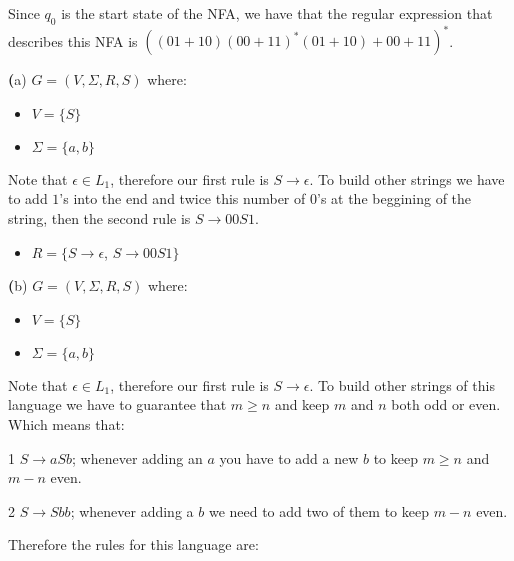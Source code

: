 \documentclass[11pt]{article}
\newcommand{\question}[2] {\vspace{0.3in}\noindent{\subsection*{Question #1. #2} \vspace{0.15in}}}
\renewcommand{\part}[1] {{\vspace{0.15in}\noindent\textbf (#1)} \vspace{0.10in}}
\begin{document}
\par Since $q_0$ is the start state of the NFA, we have that the regular expression that describes this NFA is $((01 + 10) (00 + 11)^* (01 + 10) + 00 + 11)^*$.





\question{3}{}

\part{a} $G = (V, \Sigma, R, S)$ where:
\begin{itemize}
    \item{$V = \{S\}$}
    \item{$\Sigma = \{a, b\}$}
\end{itemize}
    \par Note that $\epsilon \in L_1$, therefore our first rule is $S \rightarrow \epsilon$. To build other strings we have to add $1$'s into the end and twice this number of $0$'s at the beggining of the string, then the second rule is $S \rightarrow 00S1$.
\begin{itemize}
    \item {$R = \{S \rightarrow \epsilon$, $S \rightarrow 00S1\}$}
\end{itemize}


\part{b} $G = (V, \Sigma, R, S)$ where:

\begin{itemize}
    \item{$V = \{S\}$}
    \item{$\Sigma = \{a, b\}$}
\end{itemize}

\par Note that $\epsilon \in L_1$, therefore our first rule is $S \rightarrow \epsilon$. To build other strings of this language we have to guarantee that $m \geq n$ and keep $m$ and $n$ both odd or even. Which means that:

\par 1 $S \rightarrow aSb$; whenever adding an $a$ you have to add a new $b$ to keep $m \geq n$ and $m - n$ even.
\par 2 $S \rightarrow Sbb$; whenever adding a $b$ we need to add two of them to keep $m - n$ even.
\par Therefore the rules for this language are:
\end{document}
